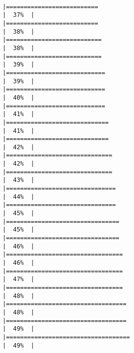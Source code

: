 \documentclass[12pt,twoside]{reedthesis}
\begin{document}
\begin{verbatim}
                                                                          |==========================                                            |  37%  |                                                                              |==========================                                            |  38%  |                                                                              |===========================                                           |  38%  |                                                                              |===========================                                           |  39%  |                                                                              |============================                                          |  39%  |                                                                              |============================                                          |  40%  |                                                                              |============================                                          |  41%  |                                                                              |=============================                                         |  41%  |                                                                              |=============================                                         |  42%  |                                                                              |==============================                                        |  42%  |                                                                              |==============================                                        |  43%  |                                                                              |===============================                                       |  44%  |                                                                              |===============================                                       |  45%  |                                                                              |================================                                      |  45%  |                                                                              |================================                                      |  46%  |                                                                              |=================================                                     |  46%  |                                                                              |=================================                                     |  47%  |                                                                              |=================================                                     |  48%  |                                                                              |==================================                                    |  48%  |                                                                              |==================================                                    |  49%  |                                                                              |===================================                                   |  49%  |     
\end{verbatim}
\end{document}

